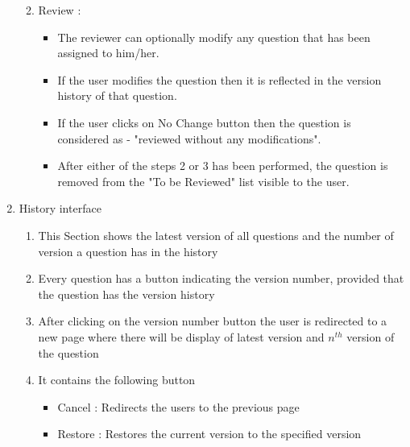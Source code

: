 \documentclass[a4paper,12pt,oneside]{book}
\begin{document}
\begin{enumerate}
\begin{enumerate}
\begin{itemize}
                \end{itemize}
            \item Review :
                \begin{itemize}
                    \item The reviewer can optionally modify any question that has been assigned to him/her.
                	\item If the user modifies the question then it is reflected in the version history of that question.
                	\item If the user clicks on No Change button then the question is considered as - "reviewed without any modifications".
                	\item After either of the steps 2 or 3 has been performed, the question is removed from the "To be Reviewed" list visible to the user.
	
                \end{itemize}

            \end{enumerate}
            
       \newpage \item History interface
            \begin{enumerate}
            \item This Section shows the latest version of all questions and the number of version a question has in the history
            \item Every question has a button indicating the version number, provided that the question has the version history
            \item After clicking on the version number button the user is redirected to a new page where there will be display of latest version and \(n^{th}\) version of the question
            \item It contains the following button
                            \begin{itemize}
                                \item Cancel : Redirects the users to the previous page
                                \item Restore : Restores the current version to the specified version
                            \end{itemize}
            \end{enumerate}
    \end{enumerate}

\vspace{2in}
\end{document}
